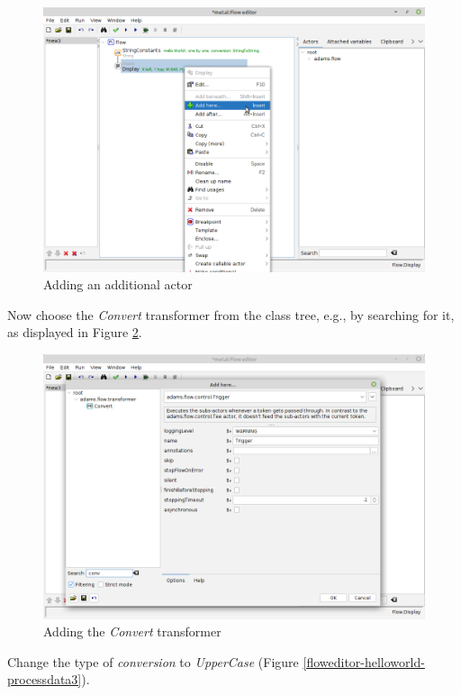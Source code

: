 \begin{figure}[htb]
  \centering
  \includegraphics[width=12.0cm]{images/floweditor-helloworld-processdata1.png}
  \caption{Adding an additional actor}
  \label{floweditor-helloworld-processdata1}
\end{figure}

Now choose the \textit{Convert} transformer from the class tree, e.g., by
searching for it, as displayed in Figure
\ref{floweditor-helloworld-processdata2}.

\begin{figure}[htb]
  \centering
  \includegraphics[width=12.0cm]{images/floweditor-helloworld-processdata2.png}
  \caption{Adding the \textit{Convert} transformer}
  \label{floweditor-helloworld-processdata2}
\end{figure}

Change the type of \textit{conversion} to \textit{UpperCase} (Figure
\ref{floweditor-helloworld-processdata3}).

